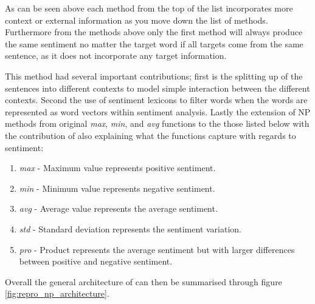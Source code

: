 As can be seen above each method from the top of the list incorporates more context or external information as you move down the list of methods. Furthermore from the methods above only the first method will always produce the same sentiment no matter the target word if all targets come from the same sentence, as it does not incorporate any target information.

This method had several important contributions; first is the splitting up of the sentences into different contexts to model simple interaction between the different contexts. Second the use of sentiment lexicons to filter words when the words are represented as word vectors within sentiment analysis. Lastly the extension of NP methods from \citet{tang-etal-2014-learning} original \textit{max}, \textit{min}, and \textit{avg} functions to the those listed below with the contribution of also explaining what the functions capture with regards to sentiment:
\begin{enumerate}
    \item \textit{max} - Maximum value represents positive sentiment.
    \item \textit{min} - Minimum value represents negative sentiment.
    \item \textit{avg} - Average value represents the average sentiment.
    \item \textit{std} - Standard deviation represents the sentiment variation.
    \item \textit{pro} - Product represents the average sentiment but with larger differences between positive and negative sentiment.
\end{enumerate}
Overall the general architecture of \citet{vo2015target} can then be summarised through figure \ref{fig:repro_np_architecture}. 


